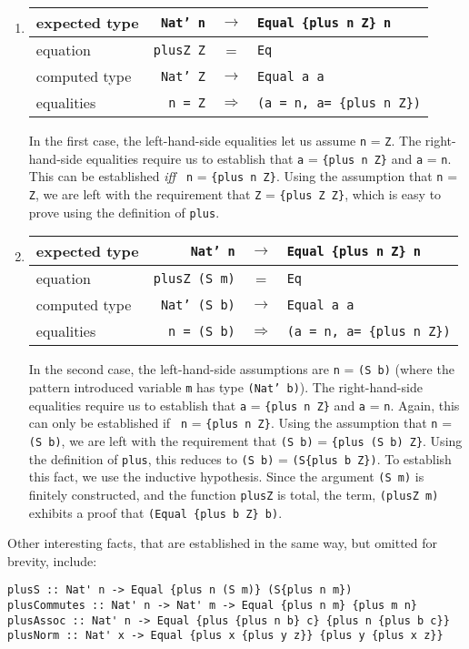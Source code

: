 \documentclass[11pt,twoside,A4]{llncs}
\newcommand{\plus}[2]{\{plus {#1} {#2}\}}
\newcommand{\deffbox}[8]{{\begin{tabular}{|l|rcl|} \hline
{\small expected type} & {\small{\tt #1}} & $\rightarrow$ & {\small{\tt #2}} \\ \hline
{\small equation} & {\small{\tt #3}} & =             & {\small{\tt #4}} \\ \hline
{\small computed type} & {\small{\tt #5}} & $\rightarrow$ & {\small{\tt #6}} \\ \hline
{\small equalities}    & {\small{\tt #7}} & $\Rightarrow$ & {\small{\tt #8}} \\ \hline 
\end{tabular}}}
\begin{document}
\begin{enumerate}

\item \deffbox{Nat' n}{Equal \plus{n}{Z} n}{plusZ Z}{Eq}{Nat' Z}{Equal a a}{n = Z}{(a = n, a= \plus{n}{Z})}

\vspace*{.1in}
In the first case, the left-hand-side equalities let us
assume \verb+n+ = \verb+Z+. The right-hand-side equalities require us
to establish that \verb+a+ = \verb+{plus n Z}+ and \verb+a+ = \verb+n+.  This can be established
{\it iff} \verb+ n+ = \verb+{plus n Z}+. Using the assumption that 
\verb+n+ = \verb+Z+, we are left with the requirement that  \verb+Z+ = \verb+{plus Z Z}+,
which is easy to prove using the definition of \verb+plus+.
\vspace*{.1in} 

\item \deffbox{Nat' n}{Equal \plus{n}{Z} n}{plusZ (S m)}{Eq}{Nat' (S b)}{Equal a a}{n = (S b)}{(a = n, a= \plus{n}{Z})}

\vspace*{.2in}
In the second case, the left-hand-side assumptions are \verb+n+ = 
\verb+(S b)+ (where the pattern introduced variable {\tt m} has type {\tt (Nat' b)}).
The right-hand-side equalities require us to establish that \verb+a+ =
\verb+{plus n Z}+ and \verb+a+ = \verb+n+.  Again, this can only be
established if  \verb+ n+ = \verb+{plus n Z}+. Using the assumption
that \verb+n+ = \verb+(S b)+, we are left with the requirement that
\verb+(S b)+ = \verb+{plus (S b) Z}+. Using the definition
of {\tt plus}, this reduces to \verb+(S b)+ = \verb+(S{plus b Z})+.
To establish this fact, we use the inductive hypothesis.
Since the argument {\tt (S m)} is finitely
constructed, and the function \verb+plusZ+ is total, the term, 
\verb+(plusZ m)+ exhibits a proof that \verb+(Equal {plus b Z} b)+. 

\end{enumerate}

Other interesting facts, that are established in the same
way, but omitted for brevity, include:

 
{\small
\begin{verbatim}
plusS :: Nat' n -> Equal {plus n (S m)} (S{plus n m})  
plusCommutes :: Nat' n -> Nat' m -> Equal {plus n m} {plus m n}
plusAssoc :: Nat' n -> Equal {plus {plus n b} c} {plus n {plus b c}}
plusNorm :: Nat' x -> Equal {plus x {plus y z}} {plus y {plus x z}}
\end{verbatim}}
\end{document}
